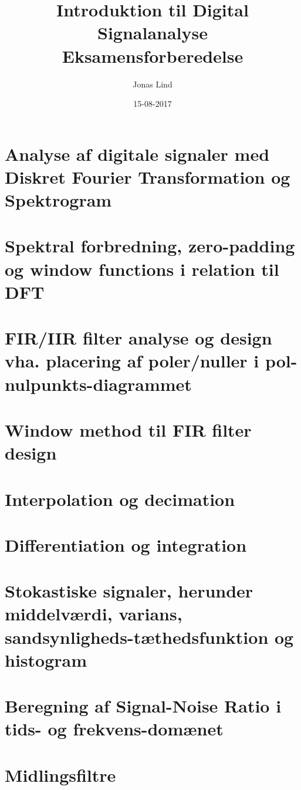 \documentclass[danish]{article}
\begin{document}
\title{\textbf{Introduktion til Digital Signalanalyse }   Eksamensforberedelse}
\author{Jonas Lind}
\date{15-08-2017}
\maketitle
\section{Analyse af digitale signaler med Diskret Fourier Transformation og Spektrogram}

\section{Spektral forbredning, zero-padding og window functions i relation til DFT}

\section{FIR/IIR filter analyse og design vha. placering af poler/nuller i pol-nulpunkts-diagrammet}

\section{Window method til FIR filter design}

\section{Interpolation og decimation}

\section{Differentiation og integration}

\section{Stokastiske signaler, herunder middelværdi, varians, sandsynligheds-tæthedsfunktion og histogram}

\section{Beregning af Signal-Noise Ratio i tids- og frekvens-domænet}

\section{Midlingsfiltre}
\end{document}
